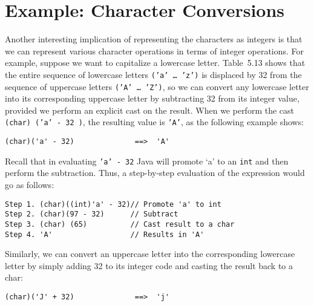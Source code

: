\section{Example: Character Conversions }
\noindent Another interesting implication of representing the
characters as integers is that we can
represent various character operations in terms of integer
operations. For example, suppose we want to capitalize a lowercase
letter. Table~5.13 shows that the entire sequence of lowercase
letters {\tt ('a'~\dots~'z')} is displaced by 32 from the sequence of
uppercase letters {\tt ('A'~\dots~'Z')}, so we can convert any lowercase
letter into its corresponding uppercase letter by subtracting 32 from
its integer value, provided we perform an explicit cast on the
result. When we perform the cast {\tt (char) ('a'~-~32 )}, the
resulting value is {\tt 'A'}, as the following example shows:

\begin{jjjlisting}
\begin{lstlisting}
(char)('a' - 32)              ==>  'A'
\end{lstlisting}
\end{jjjlisting}

\noindent Recall that in evaluating  {\tt 'a' - 32}
Java will promote `a' to an {\tt int} and then perform the
subtraction.  Thus, a step-by-step evaluation of the expression
would go as follows:

\begin{jjjlisting}
\begin{lstlisting}
Step 1. (char)((int)'a' - 32)// Promote 'a' to int
Step 2. (char)(97 - 32)      // Subtract
Step 3. (char) (65)          // Cast result to a char
Step 4. 'A'                  // Results in 'A'
\end{lstlisting}
\end{jjjlisting}

\noindent Similarly, we can convert an uppercase letter into the corresponding
lowercase letter by simply adding 32 to its integer code and casting
the result back to a char:

\begin{jjjlisting}
\begin{lstlisting}
(char)('J' + 32)              ==>  'j'
\end{lstlisting}
\end{jjjlisting}

